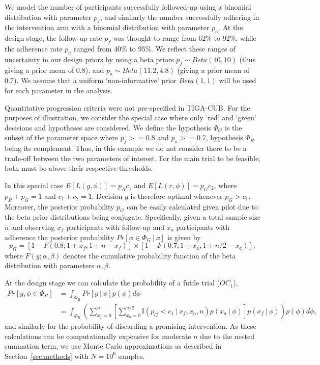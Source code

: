 \documentclass{article} %
\begin{document}
We model the number of participants successfully followed-up using a binomial distribution with parameter $p_f$, and similarly the number successfully adhering in the intervention arm with a binomial distribution with parameter $p_a$. At the design stage, the follow-up rate $p_f$ was thought to range from 62\% to 92\%, while the adherence rate $p_a$ ranged from 40\% to 95\%. We reflect these ranges of uncertainty in our design priors by using a beta priors $p_f \sim Beta(40, 10)$ (thus giving a prior mean of 0.8), and $p_a \sim Beta(11.2, 4.8)$ (giving a prior mean of 0.7). We assume that a uniform `non-informative' prior $Beta(1,1)$ will be used for each parameter in the analysis.

Quantitative progression criteria were not pre-specified in TIGA-CUB. For the purposes of illustration, we consider the special case where only `red` and `green` decisions and hypotheses are considered. We define the hypothesis $\Phi_G$ is the subset of the parameter space where $p_f >= 0.8$ and $p_a >= 0.7$, hypothesis $\Phi_R$ being its complement. Thus, in this example we do not consider there to be a trade-off between the two parameters of interest. For the main trial to be feasible, both must be above their respective thresholds.

In this special case $E[L(g, \phi)] = p_R c_1$ and $E[L(r, \phi)] = p_G c_2$, where $p_R + p_G = 1$ and $c_1 + c_2 = 1$. Decision $g$ is therefore optimal whenever $p_G > c_1$. Moreover, the posterior probability $p_G$ can be easily calculated given pilot due to the beta prior distributions being conjugate. Specifically, given a total sample size $n$ and observing $x_f$ participants with follow-up and $x_a$ participants with adherence the posterior probability $Pr[\phi \in \Phi_G ~|~ x]$ is given by
\begin{equation}
p_G = [1 - F(0.8; 1+x_f, 1+n-x_f)] \times [1 - F(0.7; 1+x_a, 1 + n/2 - x_a)],
\end{equation}
where $F(y; \alpha, \beta)$ denotes the cumulative probability function of the beta distribution with parameters $\alpha, \beta$.

At the design stage we can calculate the probability of a futile trial ($OC_1$),
\begin{align}
Pr[g, \phi \in \Phi_R] &= \int_{\Phi_R} Pr[g ~|~ \phi] p(\phi) d\phi \\
 &= \int_{\Phi_R} \left( \sum_{x_f = 0}^{n} \left[ \sum_{x_a = 0}^{n/2}  \mathbb{I}(p_G < c_1 ~|~ x_f, x_a, n) p(x_a ~|~ \phi) \right]p(x_f ~|~ \phi) \right)p(\phi) d\phi,
\end{align}
and similarly for the probability of discarding a promising intervention. As these calculations can be computationally expensive for moderate $n$ due to the nested summation term, we use Monte Carlo approximations as described in Section~\ref{sec:methods} with $N=10^6$ samples.
\end{document}
